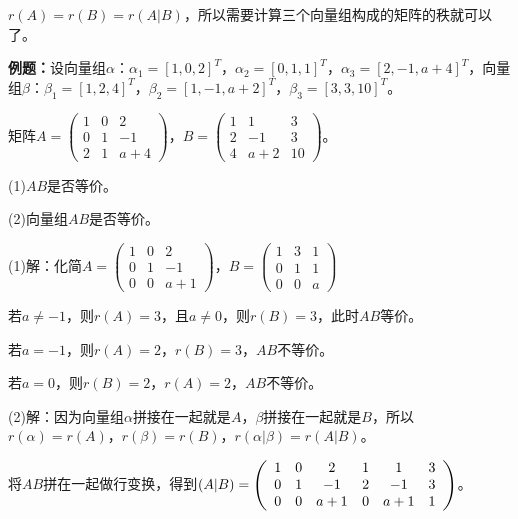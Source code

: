 $r(A)=r(B)=r(A|B)$，所以需要计算三个向量组构成的矩阵的秩就可以了。

\textbf{例题：}设向量组$\alpha$：$\alpha_1=[1,0,2]^T$，$\alpha_2=[0,1,1]^T$，$\alpha_3=[2,-1,a+4]^T$，向量组$\beta$：$\beta_1=[1,2,4]^T$，$\beta_2=[1,-1,a+2]^T$，$\beta_3=[3,3,10]^T$。

矩阵$A=\left(\begin{array}{ccc}
    1 & 0 & 2 \\
    0 & 1 & -1 \\
    2 & 1 & a+4
\end{array}\right)$，$B=\left(\begin{array}{ccc}
    1 & 1 & 3 \\
    2 & -1 & 3 \\
    4 & a+2 & 10
\end{array}\right)$。\medskip

(1)$AB$是否等价。

(2)向量组$AB$是否等价。

(1)解：化简$A=\left(\begin{array}{ccc}
    1 & 0 & 2 \\
    0 & 1 & -1 \\
    0 & 0 & a+1
\end{array}\right)$，$B=\left(\begin{array}{ccc}
    1 & 3 & 1 \\
    0 & 1 & 1 \\
    0 & 0 & a
\end{array}\right)$

若$a\neq-1$，则$r(A)=3$，且$a\neq0$，则$r(B)=3$，此时$AB$等价。

若$a=-1$，则$r(A)=2$，$r(B)=3$，$AB$不等价。

若$a=0$，则$r(B)=2$，$r(A)=2$，$AB$不等价。

(2)解：因为向量组$\alpha$拼接在一起就是$A$，$\beta$拼接在一起就是$B$，所以$r(\alpha)=r(A)$，$r(\beta)=r(B)$，$r(\alpha|\beta)=r(A|B)$。

将$AB$拼在一起做行变换，得到$(A|B)=\left(\begin{array}{c:c}
    \begin{matrix}
        1 & 0 & 2 \\
        0 & 1 & -1 \\
        0 & 0 & a+1
    \end{matrix}&
    \begin{matrix}
        1 & 1 & 3 \\
        2 & -1 & 3 \\
        0 & a+1 & 1
    \end{matrix}
\end{array}\right)$。\medskip

